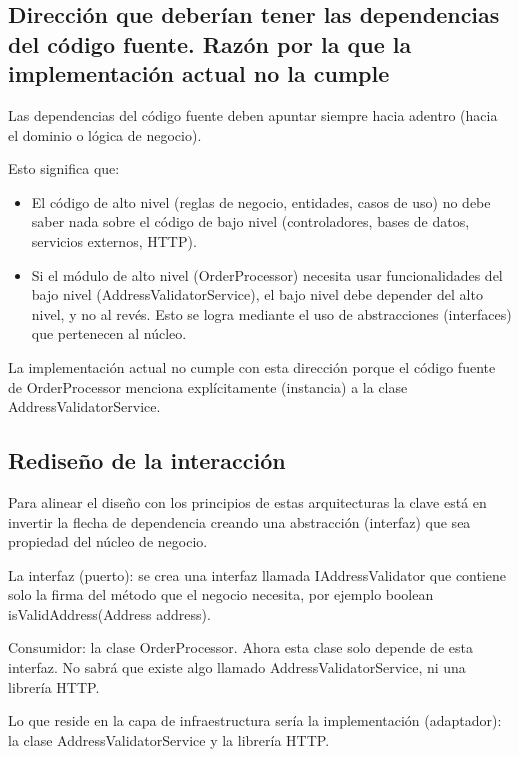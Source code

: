 \documentclass[12pt, a4paper]{article}
\begin{document}
        \subsection{Dirección que deberían tener las dependencias del código fuente. Razón por la que la implementación actual no la cumple}
        
        Las dependencias del código fuente deben apuntar siempre hacia adentro (hacia el dominio o lógica de negocio).

        Esto significa que:
        \begin{itemize}
            \item El código de alto nivel (reglas de negocio, entidades, casos de uso) no debe saber nada sobre el código de bajo nivel (controladores, bases de datos, servicios externos, HTTP).
            \item Si el módulo de alto nivel (OrderProcessor) necesita usar funcionalidades del bajo nivel (AddressValidatorService), el bajo nivel debe depender del alto nivel, y no al revés. Esto se logra mediante el uso de abstracciones (interfaces) que pertenecen al núcleo.
        \end{itemize}
        La implementación actual no cumple con esta dirección porque el código fuente de OrderProcessor menciona explícitamente (instancia) a la clase AddressValidatorService.

        \subsection{Rediseño de la interacción}

        Para alinear el diseño con los principios de estas arquitecturas la clave está en invertir la flecha de dependencia creando una abstracción (interfaz) que sea propiedad del núcleo de negocio.

        La interfaz (puerto): se crea una interfaz llamada IAddressValidator que contiene solo la firma del método que el negocio necesita, por ejemplo boolean isValidAddress(Address address).

        Consumidor: la clase OrderProcessor. Ahora esta clase solo depende de esta interfaz. No sabrá que existe algo llamado AddressValidatorService, ni una librería HTTP.

        Lo que reside en la capa de infraestructura sería la implementación (adaptador): la clase AddressValidatorService y la librería HTTP.
\end{document}
